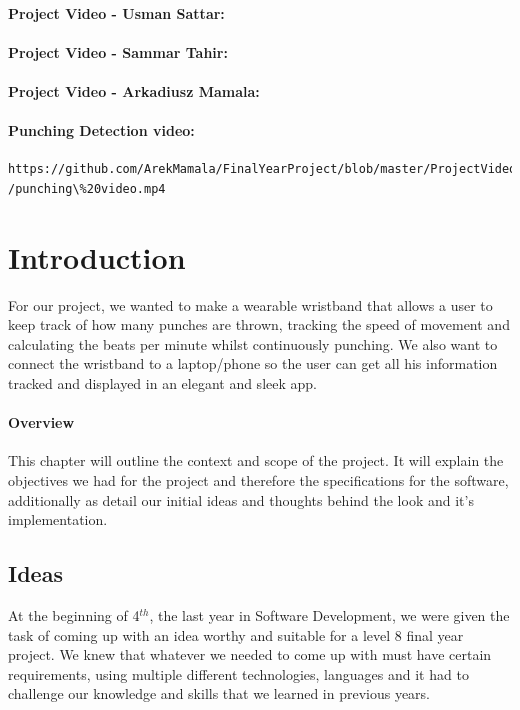 \documentclass[a4paper,12pt]{report}
\begin{document}
\subsubsection{Project Video - Usman Sattar: }
\subsubsection{Project Video - Sammar Tahir: }
\subsubsection{Project Video - Arkadiusz Mamala: }
\subsubsection{Punching Detection video: }\begin{lstlisting}
https://github.com/ArekMamala/FinalYearProject/blob/master/ProjectVideos
/punching\%20video.mp4
\end{lstlisting}
\body

\chapter{Introduction}
For our project, we wanted to make a wearable wristband that allows a user to keep track of how many punches are thrown, tracking the speed of movement and calculating the beats per minute whilst continuously punching. We also want to connect the wristband to a laptop/phone so the user can get all his information tracked and displayed in an elegant and sleek app.

\subsubsection{Overview}
This chapter will outline the context and scope of the project. It
will explain the objectives we had for the project and therefore the specifications for the software, additionally as detail our initial ideas and thoughts
behind the look and it’s implementation.

\section{Ideas}
At the beginning of 4$^{th}$, the last year in Software Development, we were given the task of coming up with an idea worthy and suitable for a level 8 final year project. We knew that whatever we needed to come up with must have certain requirements, using multiple different technologies, languages and it had to challenge our knowledge and skills that we learned in previous years.
\end{document}
